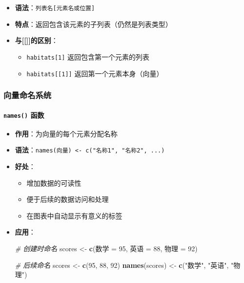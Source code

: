 \documentclass[
]{book}
\newenvironment{Shaded}{\begin{snugshade}}{\end{snugshade}}
\newcommand{\CommentTok}[1]{\textcolor[rgb]{0.56,0.35,0.01}{\textit{#1}}}
\newcommand{\DecValTok}[1]{\textcolor[rgb]{0.00,0.00,0.81}{#1}}
\newcommand{\FunctionTok}[1]{\textcolor[rgb]{0.13,0.29,0.53}{\textbf{#1}}}
\newcommand{\NormalTok}[1]{#1}
\newcommand{\OtherTok}[1]{\textcolor[rgb]{0.56,0.35,0.01}{#1}}
\newcommand{\StringTok}[1]{\textcolor[rgb]{0.31,0.60,0.02}{#1}}
\providecommand{\tightlist}{%
  \setlength{\itemsep}{0pt}\setlength{\parskip}{0pt}}
\begin{document}
\begin{itemize}
\tightlist
\item
  \textbf{语法}：\texttt{列表名{[}元素名或位置{]}}
\item
  \textbf{特点}：返回包含该元素的子列表（仍然是列表类型）
\item
  \textbf{与{[}{[}{]}{]}的区别}：

  \begin{itemize}
  \tightlist
  \item
    \texttt{habitats{[}1{]}} 返回包含第一个元素的列表
  \item
    \texttt{habitats{[}{[}1{]}{]}} 返回第一个元素本身（向量）
  \end{itemize}
\end{itemize}

\hypertarget{ux5411ux91cfux547dux540dux7cfbux7edf}{%
\subsubsection{向量命名系统}\label{ux5411ux91cfux547dux540dux7cfbux7edf}}

\hypertarget{names-ux51fdux6570}{%
\paragraph{\texorpdfstring{\texttt{names()} 函数}{names() 函数}}\label{names-ux51fdux6570}}

\begin{itemize}
\item
  \textbf{作用}：为向量的每个元素分配名称
\item
  \textbf{语法}：\texttt{names(向量)\ \textless{}-\ c("名称1",\ "名称2",\ ...)}
\item
  \textbf{好处}：

  \begin{itemize}
  \tightlist
  \item
    增加数据的可读性
  \item
    便于后续的数据访问和处理
  \item
    在图表中自动显示有意义的标签
  \end{itemize}
\item
  \textbf{应用}：

\begin{Shaded}
\begin{Highlighting}[]
\CommentTok{\# 创建时命名}
\NormalTok{scores }\OtherTok{\textless{}{-}} \FunctionTok{c}\NormalTok{(数学 }\OtherTok{=} \DecValTok{95}\NormalTok{, 英语 }\OtherTok{=} \DecValTok{88}\NormalTok{, 物理 }\OtherTok{=} \DecValTok{92}\NormalTok{)}

\CommentTok{\# 后续命名}
\NormalTok{scores }\OtherTok{\textless{}{-}} \FunctionTok{c}\NormalTok{(}\DecValTok{95}\NormalTok{, }\DecValTok{88}\NormalTok{, }\DecValTok{92}\NormalTok{)}
\FunctionTok{names}\NormalTok{(scores) }\OtherTok{\textless{}{-}} \FunctionTok{c}\NormalTok{(}\StringTok{"数学"}\NormalTok{, }\StringTok{"英语"}\NormalTok{, }\StringTok{"物理"}\NormalTok{)}
\end{Highlighting}
\end{Shaded}
\end{itemize}
\end{document}
